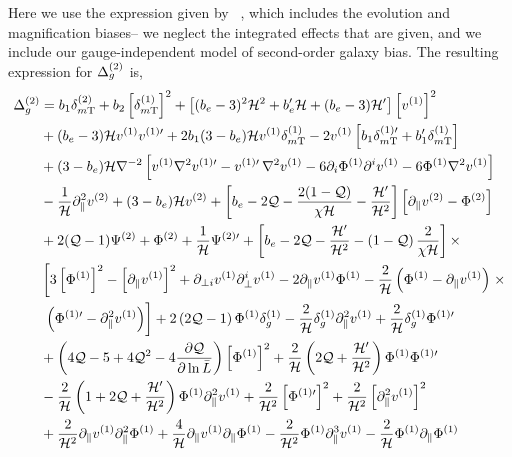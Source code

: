 Here we use the expression given by~\cite{Bertacca:2014hwa} , which includes the evolution and magnification biases-- we neglect the integrated effects that are given, and we include our gauge-independent model of second-order galaxy bias. The resulting expression for $\Delta_g^{(2)}$ is, 
\begin{align} 
\Delta_{g}^{(2)} &= b_1 \delta_{m{\mathrm{T}}}^\tw + b_2 \left[\delta_{m{\mathrm{T}}}^\on \right]^2 + \left[(b_e-3)^2 \cH^2 + b_e' \cH +(b_e-3) \cH' \right] \left[v^\on \right]^2 \nonumber \\
& + (b_e - 3)\cH v^\on v^{\on \prime} + 2b_1 (3 - b_e) \cH v^\on \delta_{m\mathrm{T}}^{(1)} - 2v^\on \left[ b_1 \delta_{m\mathrm{T}}^{\on \prime} + b_1' \delta_{m\mathrm{T}}^\on \right] \nonumber \\
&+ (3-b_{e})\cH \nabla^{-2} \left[v^\on \nabla^2 v^{\on \prime} - v^{\on \prime} \, \nabla^2 v^\on  - 6 \partial_{i}\Phi^\on \partial^{i}v^\on - 6 \Phi^\on \nabla^2 v^\on \right] \nonumber \\
&- \frac{1}{\cH} \partial_\parallel^2 v^\tw + (3-b_e) \cH v^\tw + \left[b_{e} - 2\mathcal{Q} -\frac{2(1-\mathcal{Q})}{\chi\mathcal{H}}- \frac{\mathcal{H}'}{\mathcal{H}^{2}} \right] \left[\partial_\parallel v^\tw - \Phi^\tw \right] \nonumber \\
& + 2(\Q - 1) \Psi^\tw + \Phi^\tw + \frac{1}{\cH} \Psi^{\tw\prime} + \left[ b_e-2 \Q - \frac{\cH'}{\cH^2} - \left(1 - \Q\right) \frac{2}{\chi \cH} \right] \times \nonumber \\
& \left[ 3 \left[{\Phi}^{(1)}\right]^2 - \left[ \p_\| v^\on \right]^2 + \p_{\perp i} v^\on \p^i_\perp v^\on - 2 \p_\| v^\on \Phi^\on - \frac{2}{\cH} \left( \Phi^\on - \p_\| v^\on \right) \right. \times \nonumber \\
& \left. \vphantom{\frac{1}{\cH}} \left( \Phi^{(1)\prime} - \p_\|^2 v^\on  \right)\right] +2 \left(2 \Q-1 \right) \Phi^\on \delta_g^\on - \frac{2}{\cH} \delta_g^\on \p_\|^2 v^\on +\frac{2}{\cH}\delta_g^\on \Phi^{\on \prime} \nonumber \\
& + \left( 4 \Q -5 + 4 \Q^2 - 4 \frac{\p \Q}{\p \ln \bar L} \right) \left[ \Phi^\on \right]^2 + \frac{2}{\cH} \left( 2\Q + \frac{\cH'}{\cH^2} \right) \Phi^\on \Phi^{\on \prime} \nonumber \\
& - \frac{2}{\cH} \left( 1+ 2\Q  +\frac{\cH'}{\cH^2} \right) \Phi^\on \p_\|^2 v^\on + \frac{2}{\cH^2} \left[ \Phi^{\on \prime}  \right]^2 + \frac{2}{\cH^2}\left[\p_\|^2 v^\on  \right]^2  \nonumber \\
& + \frac{2}{\cH^2} \p_\| v^{(1)}  \p_\|^2 \Phi^\on +\frac{4}{\cH}\p_\| v^\on\p_\| \Phi^\on - \frac{2}{\cH^2} \Phi^\on \p_\|^3 v^\on - \frac{2}{\cH} \Phi^\on \p_\| \Phi^\on \nonumber \\

\end{align}
